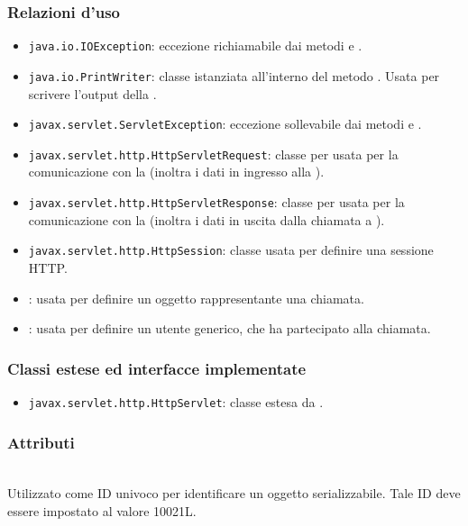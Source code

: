 \subsubsection*{Relazioni d'uso}
\begin{itemize}
	\item \texttt{java.io.IOException}: eccezione richiamabile dai metodi  e .
	\item \texttt{java.io.PrintWriter}: classe istanziata all'interno del metodo . Usata per scrivere l'output della .
	\item \texttt{javax.servlet.ServletException}: eccezione sollevabile dai metodi  e .
	\item \texttt{javax.servlet.http.HttpServletRequest}:  classe per usata per la comunicazione con la  (inoltra i dati in ingresso alla ).
	\item \texttt{javax.servlet.http.HttpServletResponse}: classe per usata per la comunicazione con la  (inoltra i dati in uscita dalla chiamata a ).
	\item \texttt{javax.servlet.http.HttpSession}: classe usata per definire una sessione HTTP.
	\item {}: usata per definire un oggetto rappresentante una chiamata.
	\item {}: usata per definire un utente generico, che ha partecipato alla chiamata.
\end{itemize}

\subsubsection*{Classi estese ed interfacce implementate}
\begin{itemize}
		\item \texttt{javax.servlet.http.HttpServlet}: classe estesa da .
\end{itemize}

\subsubsection*{Attributi}
\begin{description}
  \item{}\\
  Utilizzato come ID univoco per identificare un oggetto serializzabile. Tale ID deve essere impostato al valore 10021L.
\end{description}

